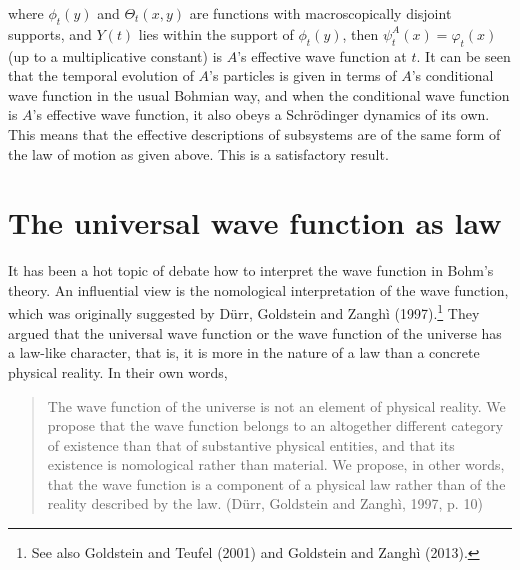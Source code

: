 \noindent where $\phi_t(y)$ and $\Theta_t(x, y)$ are functions with macroscopically disjoint supports, and $Y(t)$ lies within the support of $\phi_t(y)$, then $\psi_t^A(x)=\varphi_t(x)$ (up to a multiplicative constant) is $A$'s effective wave function at $t$. It can be seen that the temporal evolution of $A$'s particles is given in terms of $A$'s conditional wave function in the usual Bohmian way, and when the conditional wave function is  $A$'s effective wave function,  it also obeys a Schr\"{o}dinger dynamics of its own. This means that the effective descriptions of subsystems are of the same form of the law of motion as given above. This is a satisfactory result.

\section{The universal wave function as law}

It has been a hot topic of debate how to interpret the wave function in Bohm's theory. An influential view is the nomological interpretation of the wave function, which was originally suggested by D\"{u}rr, Goldstein and Zangh\`{i} (1997).\footnote{See also Goldstein and Teufel (2001) and Goldstein and Zangh\`{i} (2013).} They argued that the universal wave function or the wave function of the universe has a law-like character, that is, it is more in the nature of a law than a concrete physical reality. In their own words,

\begin{quote}
The wave function of the universe is not an element of physical reality. We propose that the wave function belongs to an altogether different category of existence than that of substantive physical entities, and that its existence is nomological rather than material. We propose, in other words, that the wave function is a component of a physical law rather than of the reality described by the law. (D\"{u}rr, Goldstein and Zangh\`{i}, 1997, p. 10)
\end{quote}

